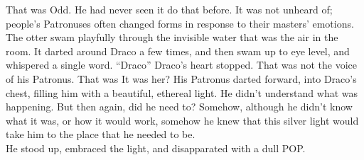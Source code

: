 
That was{\el} Odd. He had never seen it do that before. It was not unheard of; people’s Patronuses often changed forms in response to their masters’ emotions. The otter swam playfully through the invisible water that was the air in the room. It darted around Draco a few times, and then swam up to eye level, and whispered a single word.
\SmallVSpace
“Draco{\el}”
\SmallVSpace
Draco’s heart stopped. That was not the voice of his Patronus. That was{\el} It was her? His Patronus darted forward, into Draco’s chest, filling him with a beautiful, ethereal light. He didn’t understand what was happening. But then again, did he need to? Somehow, although he didn’t know what it was, or how it would work, somehow he knew that this silver light would take him to the place that he needed to be.\\

He stood up, embraced the light, and disapparated with a dull POP.

\simpleline
\SomeVSpace
{}

